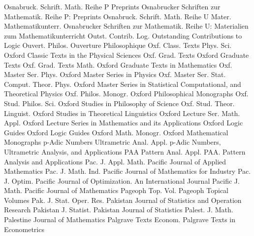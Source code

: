 {Osnabruck. Schrift. Math. Reihe P Preprints}
{Osnabrucker Schriften zur Mathematik. Reihe P: Preprints}
{Osnabruck. Schrift. Math. Reihe U Mater. Mathematikunterr.}
{Osnabrucker Schriften zur Mathematik. Reihe U: Materialien zum Mathematikunterricht}
{Outst. Contrib. Log.}
{Outstanding Contributions to Logic}
{Ouvert. Philos.}
{Ouverture Philosophique}
{Oxf. Class. Texts Phys. Sci.}
{Oxford Classic Texts in the Physical Sciences}
{Oxf. Grad. Texts}
{Oxford Graduate Texts}
{Oxf. Grad. Texts Math.}
{Oxford Graduate Texts in Mathematics}
{Oxf. Master Ser. Phys.}
{Oxford Master Series in Physics}
{Oxf. Master Ser. Stat. Comput. Theor. Phys.}
{Oxford Master Series in Statistical Computational, and Theoretical Physics}
{Oxf. Philos. Monogr.}
{Oxford Philosophical Monographs}
{Oxf. Stud. Philos. Sci.}
{Oxford Studies in Philosophy of Science}
{Oxf. Stud. Theor. Linguist.}
{Oxford Studies in Theoretical Linguistics}
{Oxford Lecture Ser. Math. Appl.}
{Oxford Lecture Series in Mathematics and its Applications}
{Oxford Logic Guides}
{Oxford Logic Guides}
{Oxford Math. Monogr.}
{Oxford Mathematical Monographs}
{p-Adic Numbers Ultrametric Anal. Appl.}
{p-Adic Numbers, Ultrametric Analysis, and Applications}
{PAA Pattern Anal. Appl.}
{PAA. Pattern Analysis and Applications}
{Pac. J. Appl. Math.}
{Pacific Journal of Applied Mathematics}
{Pac. J. Math. Ind.}
{Pacific Journal of Mathematics for Industry}
{Pac. J. Optim.}
{Pacific Journal of Optimization. An International Journal}
{Pacific J. Math.}
{Pacific Journal of Mathematics}
{Pageoph Top. Vol.}
{Pageoph Topical Volumes}
{Pak. J. Stat. Oper. Res.}
{Pakistan Journal of Statistics and Operation Research}
{Pakistan J. Statist.}
{Pakistan Journal of Statistics}
{Palest. J. Math.}
{Palestine Journal of Mathematics}
{Palgrave Texts Econom.}
{Palgrave Texts in Econometrics}
